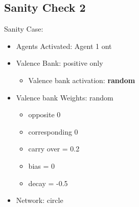 \documentclass{article}\usepackage[]{graphicx}\usepackage[]{color}
\begin{document}
\subsection{Sanity Check 2}
\label{sec:sanity2}
Sanity Case:
\begin{itemize}
  \item Agents Activated: Agent 1 ont
  \item Valence Bank: positive only
  \begin{itemize}
      \item Valence bank activation: \textbf{random}
  \end{itemize}
  \item Valence bank Weights: random
  \begin{itemize}
      \item opposite 0
      \item corresponding 0
      \item carry over = 0.2
      \item bias = 0
      \item decay = -0.5
  \end{itemize}
  \item Network: circle
\end{itemize}
\end{document}
